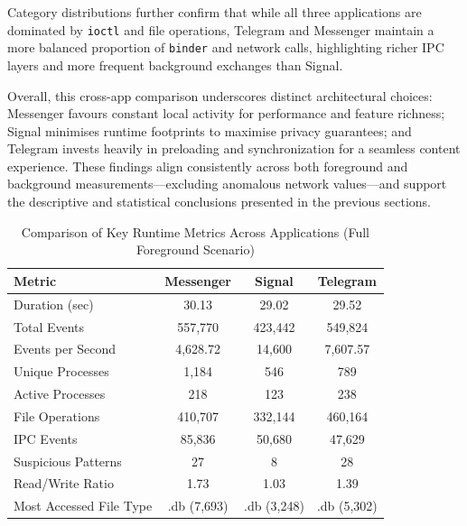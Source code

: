 \documentclass[a4paper,12pt]{report}
\begin{document}
Category distributions further confirm that while all three applications are dominated by \texttt{ioctl} and file operations, Telegram and Messenger maintain a more balanced proportion of \texttt{binder} and network calls, highlighting richer IPC layers and more frequent background exchanges than Signal.

Overall, this cross-app comparison underscores distinct architectural choices: Messenger favours constant local activity for performance and feature richness; Signal minimises runtime footprints to maximise privacy guarantees; and Telegram invests heavily in preloading and synchronization for a seamless content experience. These findings align consistently across both foreground and background measurements—excluding anomalous network values—and support the descriptive and statistical conclusions presented in the previous sections.

\begin{table}[H]
    \centering
    \caption{Comparison of Key Runtime Metrics Across Applications (Full Foreground Scenario)}
    \label{tab:comparison_key_metrics}
    \begin{tabular}{|l|c|c|c|}
        \hline
        \textbf{Metric} & \textbf{Messenger} & \textbf{Signal} & \textbf{Telegram} \\
        \hline
        Duration (sec) & 30.13 & 29.02 & 29.52 \\
        Total Events & 557,770 & 423,442 & 549,824 \\
        Events per Second & 4,628.72 & 14,600 & 7,607.57 \\
        Unique Processes & 1,184 & 546 & 789 \\
        Active Processes & 218 & 123 & 238 \\
        File Operations & 410,707 & 332,144 & 460,164 \\
        IPC Events & 85,836 & 50,680 & 47,629 \\
        Suspicious Patterns & 27 & 8 & 28 \\
        Read/Write Ratio & 1.73 & 1.03 & 1.39 \\
        Most Accessed File Type & .db (7,693) & .db (3,248) & .db (5,302) \\
        \hline
    \end{tabular}
\end{table}
\end{document}
